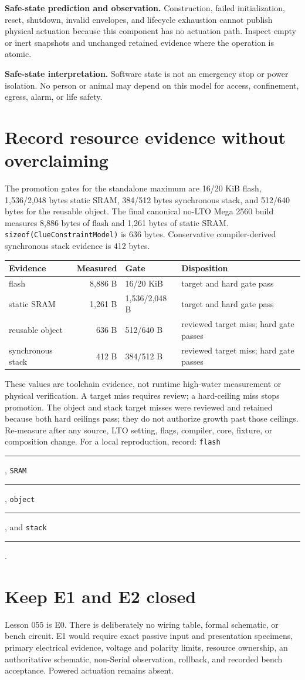 \documentclass[10pt]{article}
\newcommand{\blankline}{\rule{0.72in}{0.4pt}}
\begin{document}
\textbf{Safe-state prediction and observation.} Construction, failed
initialization, reset, shutdown, invalid envelopes, and lifecycle exhaustion
cannot publish physical actuation because this component has no actuation
path. Inspect empty or inert snapshots and unchanged retained evidence where
the operation is atomic.

\textbf{Safe-state interpretation.} Software state is not an emergency stop
or power isolation. No person or animal may depend on this model for access,
confinement, egress, alarm, or life safety.

\section{Record resource evidence without overclaiming}
The promotion gates for the standalone maximum are 16/20 KiB flash,
1,536/2,048 bytes static SRAM, 384/512 bytes synchronous stack, and 512/640
bytes for the reusable object. The final canonical no-LTO Mega 2560 build
measures 8,886 bytes of flash and 1,261 bytes of static SRAM.
\texttt{sizeof(ClueConstraintModel)} is 636 bytes. Conservative
compiler-derived synchronous stack evidence is 412 bytes.

\begin{tabularx}{\linewidth}{@{}l r l X@{}}
\toprule
Evidence & Measured & Gate & Disposition\\
\midrule
flash & 8,886 B & 16/20 KiB & target and hard gate pass\\
static SRAM & 1,261 B & 1,536/2,048 B & target and hard gate pass\\
reusable object & 636 B & 512/640 B & reviewed target miss; hard gate passes\\
synchronous stack & 412 B & 384/512 B & reviewed target miss; hard gate passes\\
\bottomrule
\end{tabularx}

These values are toolchain evidence, not runtime high-water measurement or
physical verification. A target miss requires review; a hard-ceiling miss
stops promotion. The object and stack target misses were reviewed and retained
because both hard ceilings pass; they do not authorize growth past those
ceilings. Re-measure after any source, LTO setting, flags, compiler, core,
fixture, or composition change. For a local reproduction, record:
\texttt{flash} \blankline, \texttt{SRAM} \blankline,
\texttt{object} \blankline, and \texttt{stack} \blankline.

\section{Keep E1 and E2 closed}
Lesson 055 is E0. There is deliberately no wiring table, formal schematic, or
bench circuit. E1 would require exact passive input and presentation
specimens, primary electrical evidence, voltage and polarity limits, resource
ownership, an authoritative schematic, non-Serial observation, rollback, and
recorded bench acceptance. Powered actuation remains absent.
\end{document}
